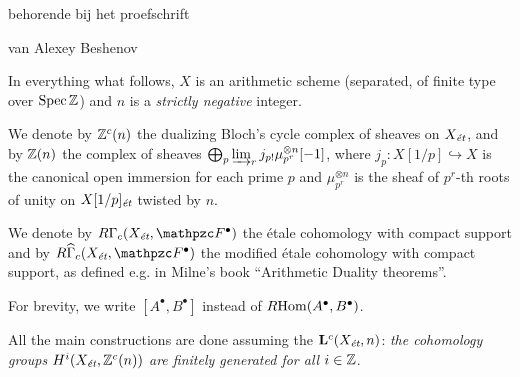 \documentclass{article}
\begin{document}
\begin{center}

  \vspace{0.5em}

  \noindent behorende bij het proefschrift

  \vspace{0.5em}


  \vspace{0.5em}

  \noindent van Alexey Beshenov
\end{center}

In everything what follows, $X$ is an arithmetic scheme (separated, of finite
type over $\operatorname{Spec} \mathbb{Z}$) and $n$ is a \emph{strictly negative} integer.

We denote by $\mathbb{Z}^c (n)$ the dualizing Bloch's cycle complex of sheaves on
$X_\text{\it ét}$, and by $\mathbb{Z} (n)$ the complex of sheaves
$\bigoplus_p \varinjlim_r j_{p!} \mu_{p^r}^{\otimes n} [-1]$, where
$j_p\colon X [1/p] \hookrightarrow X$ is the canonical open immersion for each
prime $p$ and $\mu_{p^r}^{\otimes n}$ is the sheaf of $p^r$-th roots of unity on
$X[1/p]_\text{\it ét}$ twisted by $n$.

We denote by $R\Gamma_c (X_\text{\it ét}, \mathcal{F}^\bullet)$ the étale
cohomology with compact support and by
$R\widehat{\Gamma}_c (X_\text{\it ét}, \mathcal{F}^\bullet)$ the modified étale
cohomology with compact support, as defined e.g. in Milne's book ``Arithmetic
Duality theorems''.

For brevity, we write $[A^\bullet, B^\bullet]$ instead of
$R\!\operatorname{Hom} (A^\bullet, B^\bullet)$.

\vspace{1em}

All the main constructions are done assuming the 
$\mathbf{L}^c (X_\text{\it ét}, n)$:
\emph{the cohomology groups $H^i (X_\text{\it ét}, \mathbb{Z}^c (n))$ are finitely
  generated for all $i \in \mathbb{Z}$}.
\end{document}
